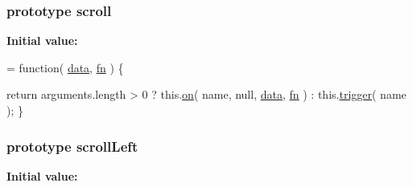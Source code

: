\hypertarget{jquery-1_810_82-vsdoc_8js_a73d4238d7a29e98ea195669790b68a9d}{
\subsubsection[{scroll}]{ {\bf prototype} scroll}}\label{jquery-1_810_82-vsdoc_8js_a73d4238d7a29e98ea195669790b68a9d}
{\bfseries Initial value\-:}
\begin{DoxyCode}
= \textcolor{keyword}{function}( \hyperlink{jquery-1_810_82-vsdoc_8js_a609407b3456fdc3c5671a9fc4a226ff7}{data}, \hyperlink{jquery-1_810_82-vsdoc_8js_acef6bdaf6b9b20fdcca1ea86f0902c3b}{fn} ) \{


        \textcolor{keywordflow}{return} arguments.length > 0 ?
            this.\hyperlink{jquery-1_810_82-vsdoc_8js_ae453b412b883f60220d73468ef6c6dbc}{on}( name, null, \hyperlink{jquery-1_810_82-vsdoc_8js_a609407b3456fdc3c5671a9fc4a226ff7}{data}, \hyperlink{jquery-1_810_82-vsdoc_8js_acef6bdaf6b9b20fdcca1ea86f0902c3b}{fn} ) :
            this.\hyperlink{jquery-1_810_82-vsdoc_8js_a2388c4114d5e3e4eab020f973641519c}{trigger}( name );
    \}
\end{DoxyCode}
\hypertarget{jquery-1_810_82-vsdoc_8js_accc573ddf4124d723e9a6da272bb24f2}{
\subsubsection[{scroll\-Left}]{ {\bf prototype} scroll\-Left}}\label{jquery-1_810_82-vsdoc_8js_accc573ddf4124d723e9a6da272bb24f2}
{\bfseries Initial value\-:}
